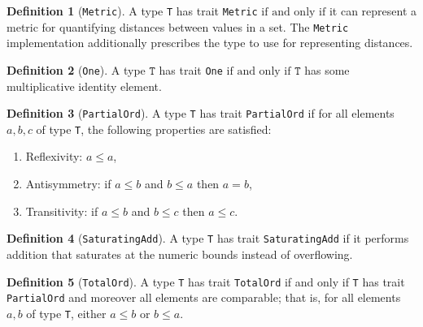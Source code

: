 \documentclass[11pt,a4paper]{article}
\theoremstyle{definition}
\newtheorem{definition}{Definition}[section]
\newcommand{\T}{\texttt{T}}
\newcommand{\iffText}{\text{if and only if}}
\begin{document}
\begin{definition}[\texttt{Metric}]
A type \texttt{T} has trait \texttt{Metric} $\iffText$ it can represent a metric for quantifying distances between values in a set. The \texttt{Metric} implementation additionally prescribes the type to use for representing distances.
\end{definition}

\begin{definition}[\texttt{One}]
    A type $\T$ has trait \texttt{One} $\iffText$ $\T$ has some multiplicative identity element.
\end{definition}


\begin{definition}[\texttt{PartialOrd}]\label{def:partial}
A type \texttt{T} has trait \texttt{PartialOrd} if for all elements $a, b, c$ of type \texttt{T}, the following properties are satisfied:

    \begin{enumerate}
        \item Reflexivity: $a \leq a$,
        \item Antisymmetry: if $a \leq b$ and $b \leq a$ then $a=b$,
        \item Transitivity: if $a \leq b$ and $b \leq c$ then $a \leq c$.
    \end{enumerate}
\end{definition}

\begin{definition}[\texttt{SaturatingAdd}]
    A type \texttt{T} has trait \texttt{SaturatingAdd} if it performs addition that saturates at the numeric bounds instead of overflowing.
\end{definition}

\begin{definition}[\texttt{TotalOrd}]
    A type \texttt{T} has trait \texttt{TotalOrd} if and only if \texttt{T} has trait \texttt{PartialOrd} and moreover all elements are comparable; that is, for all elements $a, b$ of type \texttt{T}, either $a \leq b$ or $b \leq a$.
    
    
\end{definition}
\end{document}

